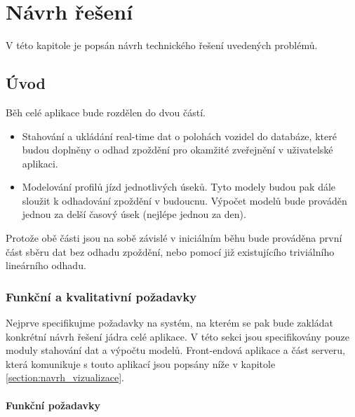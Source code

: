 

\chapter{Návrh řešení}


V této kapitole je popsán návrh technického řešení uvedených problémů.


\section{Úvod}


Běh celé aplikace bude rozdělen do dvou částí.


\begin{itemize}
\item Stahování a ukládání real-time dat o polohách vozidel do databáze, které budou doplněny o odhad zpoždění pro okamžité zveřejnění v uživatelské aplikaci.


\item Modelování profilů jízd jednotlivých úseků. Tyto modely budou pak dále sloužit k odhadování zpoždění v budoucnu. Výpočet modelů bude prováděn jednou za delší časový úsek (nejlépe jednou za den).
\end{itemize}


Protože obě části jsou na sobě závislé v iniciálním běhu bude prováděna první část sběru dat bez odhadu zpoždění, nebo pomocí již existujícího triviálního lineárního odhadu.


\subsection{Funkční a kvalitativní požadavky}


Nejprve specifikujme požadavky na systém, na kterém se pak bude zakládat
konkrétní návrh řešení jádra celé aplikace. V této sekci jsou specifikovány pouze moduly stahování dat a výpočtu modelů. Front-endová aplikace a část serveru, která komunikuje s touto aplikací jsou popsány níže v kapitole \ref{section:navrh_vizualizace}.


\subsubsection{Funkční požadavky}


